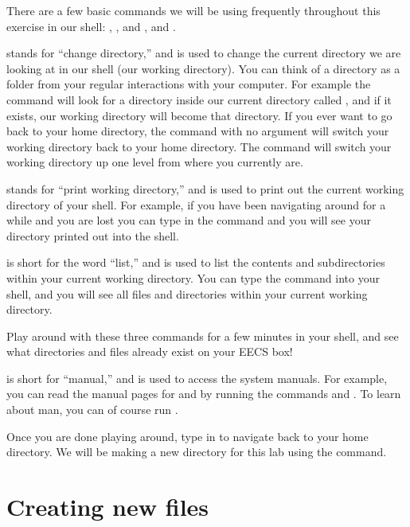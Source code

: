 \documentclass{tufte-handout}
\begin{document}
There are a few basic commands we will be using frequently throughout
this exercise in our shell: , , and
, and .

 stands for ``change directory,'' and is used to change the
current directory we are looking at in our shell (our working
directory). You can think of a directory as a folder from your regular
interactions with your computer. For example the command   will look for a
directory inside our current directory called , and
if it exists, our working directory will become that
 directory. If you ever want to go back to your home
directory, the command  with no argument will switch your
working directory back to your home directory. The command  will switch your working directory up one level from where you
currently are.

 stands for ``print working directory,'' and is used to
print out the current working directory of your shell. For example, if
you have been navigating around for a while and you are lost you can
type in the command  and you will see your directory
printed out into the shell.

 is short for the word ``list,'' and is used to list the contents
and subdirectories within your current working directory. You can type
the command  into your shell, and you will see all files and
directories within your current working directory.

Play around with these three commands for a few minutes in your shell,
and see what directories and files already exist on your EECS box!

 is short for ``manual,'' and is used to access the system
manuals. For example, you can read the manual pages for 
and  by running the commands  and
. To learn about
man, you can of course run .

Once you are done playing around, type  in to navigate back
to your home directory. We will be making a new directory for this lab
using the  command.

\section{Creating new files}
\end{document}

